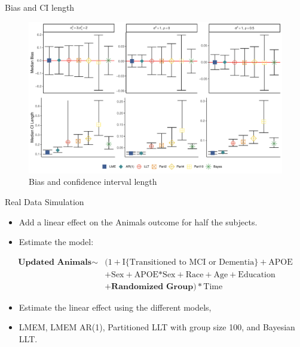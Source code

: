 \documentclass[
  ignorenonframetext,
]{beamer}
\providecommand{\tightlist}{%
  \setlength{\itemsep}{0pt}\setlength{\parskip}{0pt}}
\begin{document}
\begin{frame}{Bias and CI length}
\protect\hypertarget{bias-and-ci-length}{}
\begin{figure}
\centering
\includegraphics{Prez4_files/figure-beamer/unnamed-chunk-21-1.pdf}
\caption{Bias and confidence interval length}
\end{figure}
\end{frame}

\begin{frame}{Real Data Simulation}
\protect\hypertarget{real-data-simulation}{}
\begin{itemize}
\tightlist
\item
  Add a linear effect on the Animals outcome for half the subjects.
\item
  Estimate the model:
\end{itemize}

\begin{equation*}
\begin{aligned}
\textbf{Updated Animals} \sim & (1 + \text{I\{Transitioned to MCI or Dementia\}} + \text{APOE}\\
& + \text{Sex} + \text{APOE*Sex} + \text{Race} + \text{Age} + \text{Education}\\ 
& + \textbf{Randomized Group}) * \text{Time}
\end{aligned}
\end{equation*}

\begin{itemize}
\tightlist
\item
  Estimate the linear effect using the different models,
\item
  LMEM, LMEM AR(1), Partitioned LLT with group size 100, and Bayesian
  LLT.
\end{itemize}
\end{frame}
\end{document}
